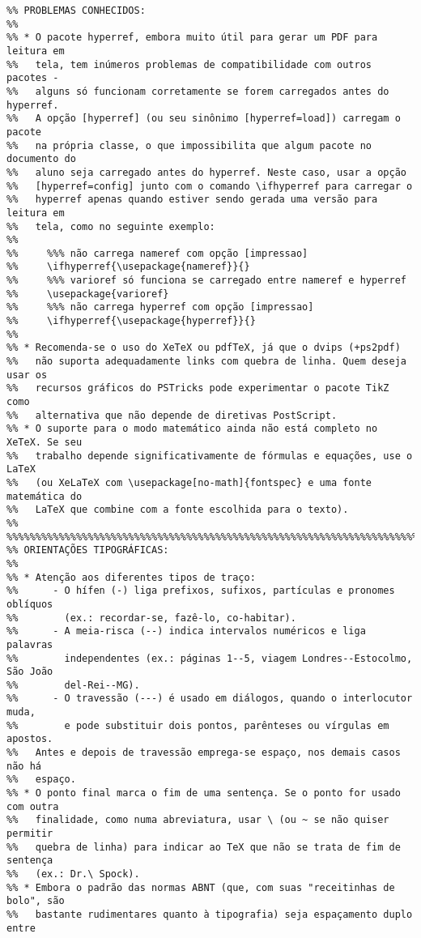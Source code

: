 \begin{verbatim}
%% PROBLEMAS CONHECIDOS:
%%
%% * O pacote hyperref, embora muito útil para gerar um PDF para leitura em
%%   tela, tem inúmeros problemas de compatibilidade com outros pacotes -
%%   alguns só funcionam corretamente se forem carregados antes do hyperref.
%%   A opção [hyperref] (ou seu sinônimo [hyperref=load]) carregam o pacote
%%   na própria classe, o que impossibilita que algum pacote no documento do
%%   aluno seja carregado antes do hyperref. Neste caso, usar a opção
%%   [hyperref=config] junto com o comando \ifhyperref para carregar o
%%   hyperref apenas quando estiver sendo gerada uma versão para leitura em
%%   tela, como no seguinte exemplo:
%%
%%     %%% não carrega nameref com opção [impressao] 
%%     \ifhyperref{\usepackage{nameref}}{}
%%     %%% varioref só funciona se carregado entre nameref e hyperref
%%     \usepackage{varioref}
%%     %%% não carrega hyperref com opção [impressao] 
%%     \ifhyperref{\usepackage{hyperref}}{}
%%
%% * Recomenda-se o uso do XeTeX ou pdfTeX, já que o dvips (+ps2pdf)
%%   não suporta adequadamente links com quebra de linha. Quem deseja usar os
%%   recursos gráficos do PSTricks pode experimentar o pacote TikZ como
%%   alternativa que não depende de diretivas PostScript.
%% * O suporte para o modo matemático ainda não está completo no XeTeX. Se seu
%%   trabalho depende significativamente de fórmulas e equações, use o LaTeX
%%   (ou XeLaTeX com \usepackage[no-math]{fontspec} e uma fonte matemática do
%%   LaTeX que combine com a fonte escolhida para o texto).
%%
%%%%%%%%%%%%%%%%%%%%%%%%%%%%%%%%%%%%%%%%%%%%%%%%%%%%%%%%%%%%%%%%%%%%%%%%%%%%%%%
%% ORIENTAÇÕES TIPOGRÁFICAS:
%%
%% * Atenção aos diferentes tipos de traço:
%%      - O hífen (-) liga prefixos, sufixos, partículas e pronomes oblíquos
%%        (ex.: recordar-se, fazê-lo, co-habitar).
%%      - A meia-risca (--) indica intervalos numéricos e liga palavras
%%        independentes (ex.: páginas 1--5, viagem Londres--Estocolmo, São João
%%        del-Rei--MG).
%%      - O travessão (---) é usado em diálogos, quando o interlocutor muda,
%%        e pode substituir dois pontos, parênteses ou vírgulas em apostos.
%%   Antes e depois de travessão emprega-se espaço, nos demais casos não há 
%%   espaço.
%% * O ponto final marca o fim de uma sentença. Se o ponto for usado com outra
%%   finalidade, como numa abreviatura, usar \ (ou ~ se não quiser permitir 
%%   quebra de linha) para indicar ao TeX que não se trata de fim de sentença
%%   (ex.: Dr.\ Spock).
%% * Embora o padrão das normas ABNT (que, com suas "receitinhas de bolo", são
%%   bastante rudimentares quanto à tipografia) seja espaçamento duplo entre 

\end{verbatim}
